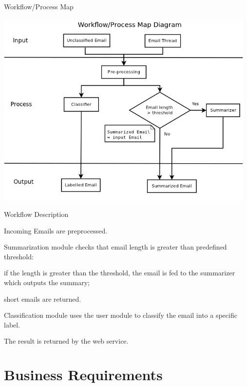 \documentclass[a4paper,10pt]{article}
\newenvironment{my_itemize}
{\begin{itemize}
  \setlength{\itemsep}{0cm}
  \setlength{\parskip}{0cm}}
{\end{itemize}}
\newenvironment{my_enumerate}
{\begin{enumerate}
  \setlength{\itemsep}{0cm}
  \setlength{\parskip}{0cm}}
{\end{enumerate}}
\begin{document}
\begin{my_enumerate}
  \item Workflow/Process Map \\ \\
  \includegraphics[width=13cm]{workflow_process_map.png}
  \item Workflow Description
  \begin{my_itemize}
    \item Incoming Emails are preprocessed.
    \item Summarization module checks that email length is greater than predefined threshold:
    \begin{my_itemize}
      \item if the length is greater than the threshold, the email is fed to the 
	    summarizer which outputs the summary;
      \item short emails are returned.
    \end{my_itemize}
    \item Classification module uses the user module to classify the email into a specific label.
    \item The result is returned by the web service.
  \end{my_itemize}
\end{my_enumerate}


\section{Business Requirements}
\end{document}
